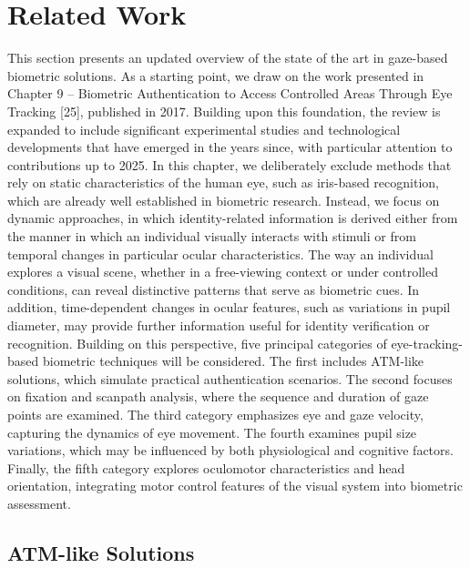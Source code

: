 \documentclass[12pt]{report}
\begin{document}
\newpage
\chapter{Related Work}

This section presents an updated overview of the state of the art in gaze-based biometric solutions.
As a starting point, we draw on the work presented in Chapter 9 – Biometric Authentication to Access Controlled Areas Through Eye Tracking [25], published in 2017. 
Building upon this foundation, the review is expanded to include significant experimental studies and technological developments that have emerged in the years since, with particular attention to contributions up to 2025.
In this chapter, we deliberately exclude methods that rely on static characteristics of the human eye, such as iris-based recognition, which are already well established in biometric research. 
Instead, we focus on dynamic approaches, in which identity-related information is derived either from the manner in which an individual visually interacts with stimuli or from temporal changes in particular ocular characteristics.
The way an individual explores a visual scene, whether in a free-viewing context or under controlled conditions, can reveal distinctive patterns that serve as biometric cues.
In addition, time-dependent changes in ocular features, such as variations in pupil diameter, may provide further information useful for identity verification or recognition.
Building on this perspective, five principal categories of eye-tracking-based biometric techniques will be considered. 
The first includes ATM-like solutions, which simulate practical authentication scenarios.
The second focuses on fixation and scanpath analysis, where the sequence and duration of gaze points are examined. 
The third category emphasizes eye and gaze velocity, capturing the dynamics of eye movement. 
The fourth examines pupil size variations, which may be influenced by both physiological and cognitive factors.
Finally, the fifth category explores oculomotor characteristics and head orientation, integrating motor control features of the visual system into biometric assessment.

\section{ATM-like Solutions}
\end{document}
